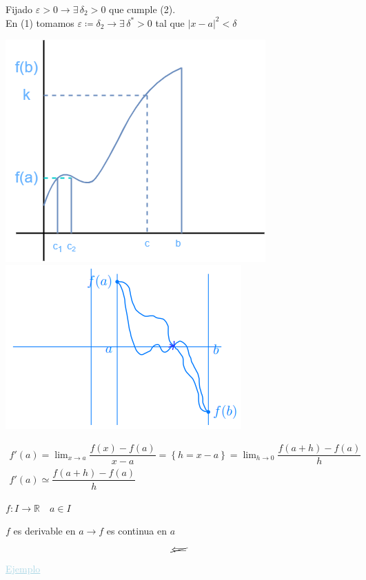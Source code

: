 \documentclass[12pt]{article}
\begin{document}
Fijado $\varepsilon>0\longrightarrow\exists\,\delta_2>0$ que cumple (2).\\
En (1) tomamos $\varepsilon\coloneq\delta_2\longrightarrow\exists\,\delta^*>0$ tal que $|x-a|^2<\delta$

\begin{center}
	\includegraphics[scale=0.5]{"imagenes/Gráfica 20-10"}
\qquad
\includegraphics{"imagenes/Gráfica2 20-10"}
\end{center}

$\begin{array}{l}
	f'(a)=\lim_{x\to a}\dfrac{f(x)-f(a)}{x-a}=\left\{h=x-a\right\}=\lim_{h\to0}\dfrac{f(a+h)-f(a)}{h}\\
	f'(a)\simeq\dfrac{f(a+h)-f(a)}{h}
\end{array}$

$f:I\longrightarrow\mathbb{R}\quad a\in I$

$f$ es derivable en $a\longrightarrow f$ es continua en $a$ \[\cancel{\Longleftarrow} \]
\textcolor{lightblue}{\underline{Ejemplo}}
\end{document}
